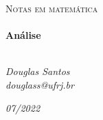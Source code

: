 \begin{titlepage}
   \begin{center}
      \textsc{\Large Notas em matemática}\\[0.5cm]

      \LinhaR \\[0.4cm]
         { \LARGE \bfseries Análise \\[0.4cm]}
      \LinhaR \\[1.4cm]

      \noindent
      \begin{minipage}{0.4\textwidth}
         \begin{center} \large
            \emph{Douglas Santos}\\
            \itshape{douglass@ufrj.br}
         \end{center}
      \end{minipage}

      \begin{center}
      \end{center}
      \vfill
      {\large \textit{07/2022}}
   \end{center}
\end{titlepage}
\clearpage
